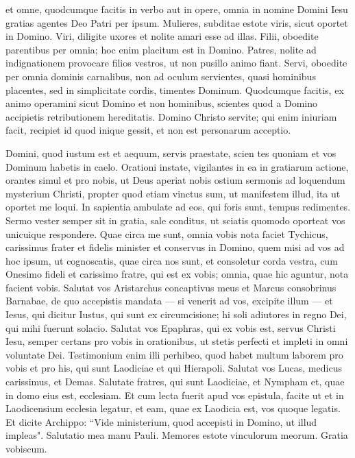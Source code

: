 \begin{biblechapter}
\verse et omne, quodcumque facitis in verbo aut in opere, omnia in nomine Domini Iesu gratias agentes Deo Patri per ipsum. 
\verse Mulieres, subditae estote viris, sicut oportet in Domino. 
\verse Viri, diligite uxores et nolite amari esse ad illas. 
\verse Filii, oboedite parentibus per omnia; hoc enim placitum est in Domino. 
\verse Patres, nolite ad indignationem provocare filios vestros, ut non pusillo animo fiant. 
\verse Servi, oboedite per omnia dominis carnalibus, non ad oculum servientes, quasi hominibus placentes, sed in simplicitate cordis, timentes Dominum. 
\verse Quodcumque facitis, ex animo operamini sicut Domino et non hominibus, 
\verse scientes quod a Domino accipietis retributionem hereditatis. Domino Christo servite; 
\verse qui enim iniuriam facit, recipiet id quod inique gessit, et non est personarum acceptio. 
\end{biblechapter}

\begin{biblechapter}  
\verse Domini, quod iustum est et aequum, servis praestate, scien tes quoniam et vos Dominum habetis in caelo. 
\verse Orationi instate, vigilantes in ea in gratiarum actione, 
\verse orantes simul et pro nobis, ut Deus aperiat nobis ostium sermonis ad loquendum mysterium Christi, propter quod etiam vinctus sum, 
\verse ut manifestem illud, ita ut oportet me loqui. 
\verse In sapientia ambulate ad eos, qui foris sunt, tempus redimentes. 
\verse Sermo vester semper sit in gratia, sale conditus, ut sciatis quomodo oporteat vos unicuique respondere. 
\verse Quae circa me sunt, omnia vobis nota faciet Tychicus, carissimus frater et fidelis minister et conservus in Domino, 
\verse quem misi ad vos ad hoc ipsum, ut cognoscatis, quae circa nos sunt, et consoletur corda vestra, 
\verse cum Onesimo fideli et carissimo fratre, qui est ex vobis; omnia, quae hic aguntur, nota facient vobis. 
\verse Salutat vos Aristarchus concaptivus meus et Marcus consobrinus Barnabae, de quo accepistis mandata — si venerit ad vos, excipite illum — 
\verse et Iesus, qui dicitur Iustus, qui sunt ex circumcisione; hi soli adiutores in regno Dei, qui mihi fuerunt solacio. 
\verse Salutat vos Epaphras, qui ex vobis est, servus Christi Iesu, semper certans pro vobis in orationibus, ut stetis perfecti et impleti in omni voluntate Dei. 
\verse Testimonium enim illi perhibeo, quod habet multum laborem pro vobis et pro his, qui sunt Laodiciae et qui Hierapoli. 
\verse Salutat vos Lucas, medicus carissimus, et Demas. 
\verse Salutate fratres, qui sunt Laodiciae, et Nympham et, quae in domo eius est, ecclesiam. 
\verse Et cum lecta fuerit apud vos epistula, facite ut et in Laodicensium ecclesia legatur, et eam, quae ex Laodicia est, vos quoque legatis. 
\verse Et dicite Archippo: “Vide ministerium, quod accepisti in Domino, ut illud impleas". 
\verse Salutatio mea manu Pauli. Memores estote vinculorum meorum. Gratia vobiscum.   
\end{biblechapter}
